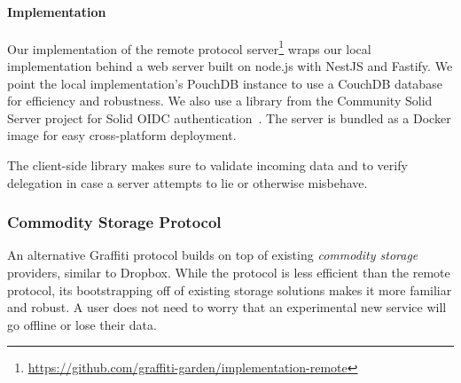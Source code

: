 



\paragraph{Implementation}

Our implementation of the remote protocol server\footnote{
    \url{https://github.com/graffiti-garden/implementation-remote}
} wraps our local implementation behind
a web server built on node.js with NestJS and Fastify.
We point the local implementation's PouchDB instance
to use a CouchDB database for efficiency and robustness.
We also use a library from the Community Solid Server project
for Solid OIDC authentication~\cite{communitysolidserver}.
The server is bundled as a Docker image for easy
cross-platform deployment.

The client-side library makes sure to validate
incoming data and to verify delegation in case a server attempts
to lie or otherwise misbehave.

\subsubsection{Commodity Storage Protocol}
\label{above-and-below:commodity-storage-protocol}

An alternative Graffiti protocol builds on top of existing
\emph{commodity storage} providers,
similar to Dropbox.
While the protocol is less efficient than the remote
protocol, its bootstrapping off of existing
storage solutions makes it more familiar and robust.
A user does not need to worry that an experimental new service
will go offline or lose their data.

